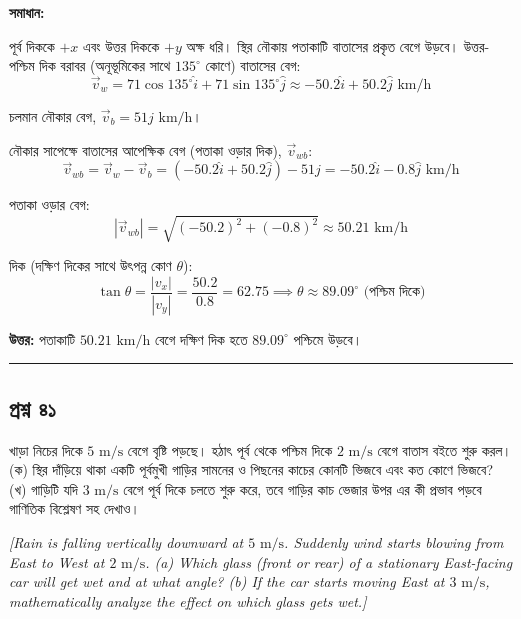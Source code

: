 \documentclass[11pt,a4paper]{article}
\begin{document}
\textbf{সমাধান:}

পূর্ব দিককে $+x$ এবং উত্তর দিককে $+y$ অক্ষ ধরি।
স্থির নৌকায় পতাকাটি বাতাসের প্রকৃত বেগে উড়বে। উত্তর-পশ্চিম দিক বরাবর (অনূভূমিকের সাথে $135^\circ$ কোণে) বাতাসের বেগ:
$$\vec{v}_w = 71\cos 135^\circ\hat{i} + 71\sin 135^\circ\hat{j} \approx -50.2\hat{i} + 50.2\hat{j}\text{ km/h}$$

চলমান নৌকার বেগ, $\vec{v}_b = 51\hat{j}\text{ km/h}$।

নৌকার সাপেক্ষে বাতাসের আপেক্ষিক বেগ (পতাকা ওড়ার দিক), $\vec{v}_{wb}$:
$$\vec{v}_{wb} = \vec{v}_w - \vec{v}_b = (-50.2\hat{i} + 50.2\hat{j}) - 51\hat{j} = -50.2\hat{i} - 0.8\hat{j}\text{ km/h}$$

পতাকা ওড়ার বেগ:
$$|\vec{v}_{wb}| = \sqrt{(-50.2)^2 + (-0.8)^2} \approx 50.21\text{ km/h}$$

দিক (দক্ষিণ দিকের সাথে উৎপন্ন কোণ $\theta$):
$$\tan\theta = \frac{|v_x|}{|v_y|} = \frac{50.2}{0.8} = 62.75 \implies \theta \approx 89.09^\circ\text{ (পশ্চিম দিকে)}$$

\textbf{উত্তর:} পতাকাটি $50.21\text{ km/h}$ বেগে দক্ষিণ দিক হতে $89.09^\circ$ পশ্চিমে উড়বে।

\vspace{0.5cm}
\hrule
\vspace{0.5cm}

\subsection*{প্রশ্ন ৪১}

খাড়া নিচের দিকে $5\text{ m/s}$ বেগে বৃষ্টি পড়ছে। হঠাৎ পূর্ব থেকে পশ্চিম দিকে $2\text{ m/s}$ বেগে বাতাস বইতে শুরু করল।
(ক) স্থির দাঁড়িয়ে থাকা একটি পূর্বমুখী গাড়ির সামনের ও পিছনের কাচের কোনটি ভিজবে এবং কত কোণে ভিজবে?
(খ) গাড়িটি যদি $3\text{ m/s}$ বেগে পূর্ব দিকে চলতে শুরু করে, তবে গাড়ির কাচ ভেজার উপর এর কী প্রভাব পড়বে গাণিতিক বিশ্লেষণ সহ দেখাও।

\smallskip
\textit{[Rain is falling vertically downward at $5\text{ m/s}$. Suddenly wind starts blowing from East to West at $2\text{ m/s}$. (a) Which glass (front or rear) of a stationary East-facing car will get wet and at what angle? (b) If the car starts moving East at $3\text{ m/s}$, mathematically analyze the effect on which glass gets wet.]}

\vspace{0.3cm}
\begin{center}
\end{center}
\end{document}
